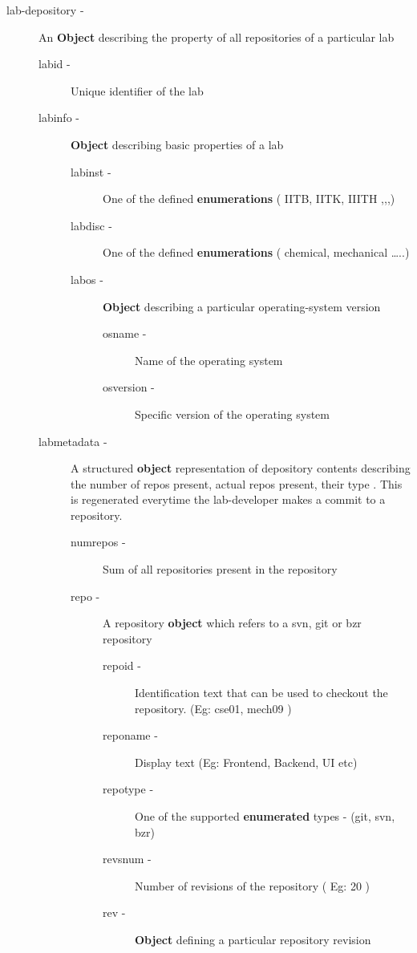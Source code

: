 \documentclass[11pt]{article}
\begin{document}
\begin{description}
\item [lab-depository -] An \textbf{Object} describing the property of all
                    repositories of a particular lab

\begin{description}
\item [labid -] Unique identifier of the lab
\item [labinfo -] \textbf{Object} describing basic properties of a lab

\begin{description}
\item [labinst -] One of the defined \textbf{enumerations} ( IITB, IITK, IIITH ,,,)
\item [labdisc -] One of the defined \textbf{enumerations} ( chemical, mechanical \ldots{}..)
\item [labos -] \textbf{Object} describing a particular operating-system version

\begin{description}
\item [osname -] Name of the operating system
\item [osversion -] Specific version of the operating system
\end{description}

\end{description}

\item [labmetadata -] A structured \textbf{object} representation of depository
                     contents describing the number of repos present,
                     actual repos present, their type . This is regenerated
                     everytime the lab-developer makes a commit to a
                     repository.

\begin{description}
\item [numrepos -] Sum of all repositories present in the repository
\item [repo -] A repository \textbf{object} which refers to a svn, git or bzr repository

\begin{description}
\item [repoid -] Identification text that can be used to checkout the repository. (Eg: cse01, mech09 )
\item [reponame -] Display text (Eg: Frontend, Backend, UI etc)
\item [repotype -] One of the supported \textbf{enumerated} types - (git, svn, bzr)
\item [revsnum -] Number of revisions of the repository ( Eg: 20 )
\item [rev -] \textbf{Object} defining a particular repository revision


\end{description}
\end{description}
\end{description}
\end{description}
\end{document}
